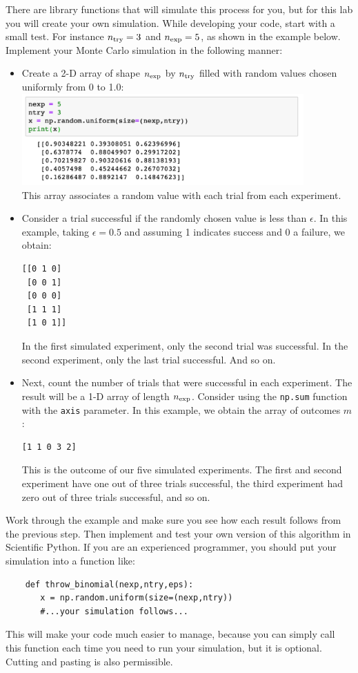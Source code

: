 There are library functions that will simulate this process for you,
but for this lab you will create your own simulation.  While
developing your code, start with a small test. For instance $n_{\rm
  try} = 3$ and $n_{\rm exp}=5$, as shown in the example below.
Implement your Monte Carlo simulation in the following manner:
\begin{itemize}
\item Create a 2-D array of shape $n_{\rm exp}$ by $n_{\rm try}$
  filled with random values chosen uniformly from 0 to 1.0:\\
\includegraphics[width=0.85\textwidth]{figs/labs/distributions/makearray.png} \\
This array associates a random value with each trial from each
experiment.  
\item Consider a trial successful if the randomly chosen value is less
  than $\epsilon$.  In this example, taking $\epsilon = 0.5$ and
  assuming 1 indicates success and 0 a failure, we obtain:
\begin{samepage}
\begin{verbatim}
[[0 1 0]
 [0 0 1]
 [0 0 0]
 [1 1 1]
 [1 0 1]]
\end{verbatim}
\end{samepage}
In the first simulated experiment, only the second trial was
successful.  In the second experiment, only the last trial successful.
And so on.

\item Next, count the number of trials that were successful in each experiment.  The result will be a 1-D array of length $n_{\rm exp}$.  Consider using the {\tt np.sum} function with the {\tt axis} parameter.  In this example, we obtain the array of outcomes $m$:
\begin{verbatim} 
[1 1 0 3 2]
\end{verbatim}
This is the outcome of our five simulated experiments.  The first
and second experiment have one out of three trials successful, the third
experiment had zero out of three trials successful, and so on.
\end{itemize}

Work through the example and make sure you see how each result follows
from the previous step.  Then implement and test your own version of
this algorithm in Scientific Python.  If you are an experienced
programmer, you should put your simulation into a function like:
\begin{verbatim}
    def throw_binomial(nexp,ntry,eps):
       x = np.random.uniform(size=(nexp,ntry))
       #...your simulation follows...    
\end{verbatim}
This will make your code much easier to manage, because you can simply call this function each time you need to run your simulation, but it is optional.  Cutting and pasting is also permissible.


